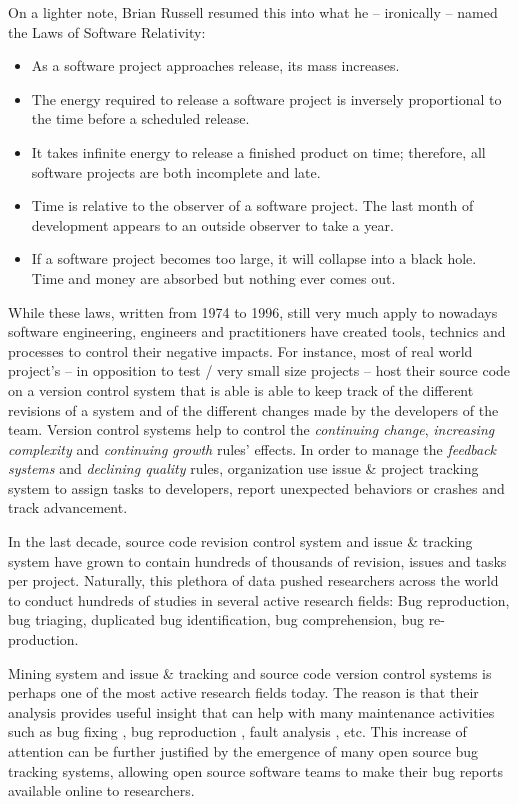 On a lighter note, Brian Russell resumed this into what he -- ironically -- named the Laws of Software Relativity:

\begin{itemize}
\item As a software project approaches release, its mass increases.
\item The energy required to release a software project is inversely proportional to the time before a scheduled release.
\item It takes infinite energy to release a finished product on time; therefore, all software projects are both incomplete and late.
\item Time is relative to the observer of a software project. The last month of development appears to an outside observer to take a year.
\item If a software project becomes too large, it will collapse into a black hole. Time and money are absorbed but nothing ever comes out.
\end{itemize}

While these laws, written from 1974 to 1996, still very much apply to nowadays software engineering, engineers and practitioners have created tools, technics and processes to control their negative impacts. 
For instance, most of real world project's -- in opposition to test / very small size projects -- host their source code on a version control system \cite{rochkind1975source} that is able is able to keep track of the different revisions of a system and of the different changes made by the developers of the team. 
Version control systems help to control the {\it continuing change}, {\it increasing complexity} and {\it continuing growth} rules' effects. 
In order to manage the {\it feedback systems} and {\it declining quality} rules, organization use issue \& project tracking system to assign tasks to developers, report unexpected behaviors or crashes and track advancement.

In the last decade, source code revision control system and issue \& tracking system have grown to contain hundreds of thousands of revision, issues and tasks per project. 
Naturally, this plethora of data pushed researchers across the world to conduct hundreds of studies in several active research fields: Bug reproduction, bug triaging, duplicated bug identification, bug comprehension, bug re-production.

Mining system and issue \& tracking and source code version control systems is perhaps one of the most active research fields today. The reason is that their analysis provides useful insight that can help with many maintenance activities such as bug fixing \cite{Weiss2007,Saha2014}, bug reproduction \cite{Artzi2008,Jin2012,Chen2013}, fault analysis \cite{Jiang2012,Jin2013}, etc. This increase of attention can be further justified by the emergence of many open source bug tracking systems, allowing open source software teams to make their bug reports available online to researchers.

